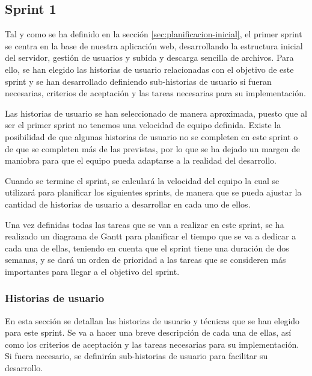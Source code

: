 \subsection{Sprint 1}
Tal y como se ha definido en la sección \ref{sec:planificacion-inicial}, el primer sprint se centra en la base de nuestra aplicación web, desarrollando la estructura inicial del servidor, gestión de usuarios y subida y descarga sencilla de archivos.
Para ello, se han elegido las historias de usuario relacionadas con el objetivo de este sprint y se han desarrollado definiendo sub-historias de usuario si fueran necesarias, criterios de aceptación y las tareas necesarias para su implementación.

Las historias de usuario se han seleccionado de manera aproximada, puesto que al ser el primer sprint no tenemos una velocidad de equipo definida. Existe la posibilidad de que algunas historias de usuario no se completen en este sprint o de que se completen más de las previstas, por lo que se ha dejado un margen de maniobra para que el equipo pueda adaptarse a la realidad del desarrollo.

Cuando se termine el sprint, se calculará la velocidad del equipo la cual se utilizará para planificar los siguientes sprints, de manera que se pueda ajustar la cantidad de historias de usuario a desarrollar en cada uno de ellos.

Una vez definidas todas las tareas que se van a realizar en este sprint, se ha realizado un diagrama de Gantt para planificar el tiempo que se va a dedicar a cada una de ellas, teniendo en cuenta que el sprint tiene una duración de dos semanas, y se dará un orden de prioridad a las tareas que se consideren más importantes para llegar a el objetivo del sprint.

\subsubsection{Historias de usuario}
En esta sección se detallan las historias de usuario y técnicas que se han elegido para este sprint. Se va a hacer una breve descripción de cada una de ellas, así como los criterios de aceptación y las tareas necesarias para su implementación. Si fuera necesario, se definirán sub-historias de usuario para facilitar su desarrollo.

